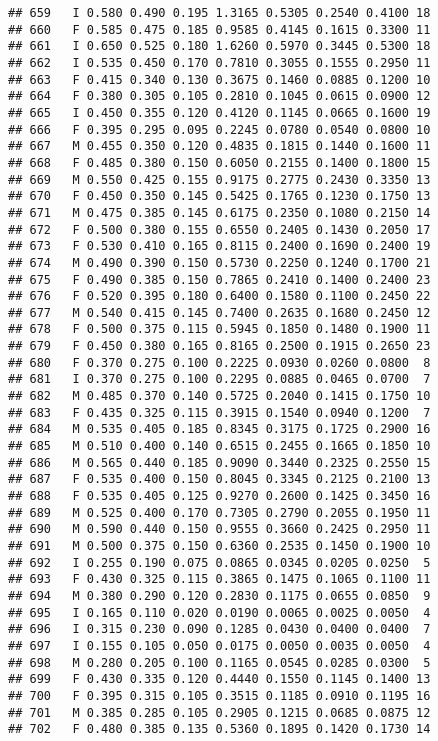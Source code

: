 \documentclass[
]{article}
\begin{document}
\begin{verbatim}
## 659   I 0.580 0.490 0.195 1.3165 0.5305 0.2540 0.4100 18
## 660   F 0.585 0.475 0.185 0.9585 0.4145 0.1615 0.3300 11
## 661   I 0.650 0.525 0.180 1.6260 0.5970 0.3445 0.5300 18
## 662   I 0.535 0.450 0.170 0.7810 0.3055 0.1555 0.2950 11
## 663   F 0.415 0.340 0.130 0.3675 0.1460 0.0885 0.1200 10
## 664   F 0.380 0.305 0.105 0.2810 0.1045 0.0615 0.0900 12
## 665   I 0.450 0.355 0.120 0.4120 0.1145 0.0665 0.1600 19
## 666   F 0.395 0.295 0.095 0.2245 0.0780 0.0540 0.0800 10
## 667   M 0.455 0.350 0.120 0.4835 0.1815 0.1440 0.1600 11
## 668   F 0.485 0.380 0.150 0.6050 0.2155 0.1400 0.1800 15
## 669   M 0.550 0.425 0.155 0.9175 0.2775 0.2430 0.3350 13
## 670   F 0.450 0.350 0.145 0.5425 0.1765 0.1230 0.1750 13
## 671   M 0.475 0.385 0.145 0.6175 0.2350 0.1080 0.2150 14
## 672   F 0.500 0.380 0.155 0.6550 0.2405 0.1430 0.2050 17
## 673   F 0.530 0.410 0.165 0.8115 0.2400 0.1690 0.2400 19
## 674   M 0.490 0.390 0.150 0.5730 0.2250 0.1240 0.1700 21
## 675   F 0.490 0.385 0.150 0.7865 0.2410 0.1400 0.2400 23
## 676   F 0.520 0.395 0.180 0.6400 0.1580 0.1100 0.2450 22
## 677   M 0.540 0.415 0.145 0.7400 0.2635 0.1680 0.2450 12
## 678   F 0.500 0.375 0.115 0.5945 0.1850 0.1480 0.1900 11
## 679   F 0.450 0.380 0.165 0.8165 0.2500 0.1915 0.2650 23
## 680   F 0.370 0.275 0.100 0.2225 0.0930 0.0260 0.0800  8
## 681   I 0.370 0.275 0.100 0.2295 0.0885 0.0465 0.0700  7
## 682   M 0.485 0.370 0.140 0.5725 0.2040 0.1415 0.1750 10
## 683   F 0.435 0.325 0.115 0.3915 0.1540 0.0940 0.1200  7
## 684   M 0.535 0.405 0.185 0.8345 0.3175 0.1725 0.2900 16
## 685   M 0.510 0.400 0.140 0.6515 0.2455 0.1665 0.1850 10
## 686   M 0.565 0.440 0.185 0.9090 0.3440 0.2325 0.2550 15
## 687   F 0.535 0.400 0.150 0.8045 0.3345 0.2125 0.2100 13
## 688   F 0.535 0.405 0.125 0.9270 0.2600 0.1425 0.3450 16
## 689   M 0.525 0.400 0.170 0.7305 0.2790 0.2055 0.1950 11
## 690   M 0.590 0.440 0.150 0.9555 0.3660 0.2425 0.2950 11
## 691   M 0.500 0.375 0.150 0.6360 0.2535 0.1450 0.1900 10
## 692   I 0.255 0.190 0.075 0.0865 0.0345 0.0205 0.0250  5
## 693   F 0.430 0.325 0.115 0.3865 0.1475 0.1065 0.1100 11
## 694   M 0.380 0.290 0.120 0.2830 0.1175 0.0655 0.0850  9
## 695   I 0.165 0.110 0.020 0.0190 0.0065 0.0025 0.0050  4
## 696   I 0.315 0.230 0.090 0.1285 0.0430 0.0400 0.0400  7
## 697   I 0.155 0.105 0.050 0.0175 0.0050 0.0035 0.0050  4
## 698   M 0.280 0.205 0.100 0.1165 0.0545 0.0285 0.0300  5
## 699   F 0.430 0.335 0.120 0.4440 0.1550 0.1145 0.1400 13
## 700   F 0.395 0.315 0.105 0.3515 0.1185 0.0910 0.1195 16
## 701   M 0.385 0.285 0.105 0.2905 0.1215 0.0685 0.0875 12
## 702   F 0.480 0.385 0.135 0.5360 0.1895 0.1420 0.1730 14

\end{verbatim}
\end{document}
